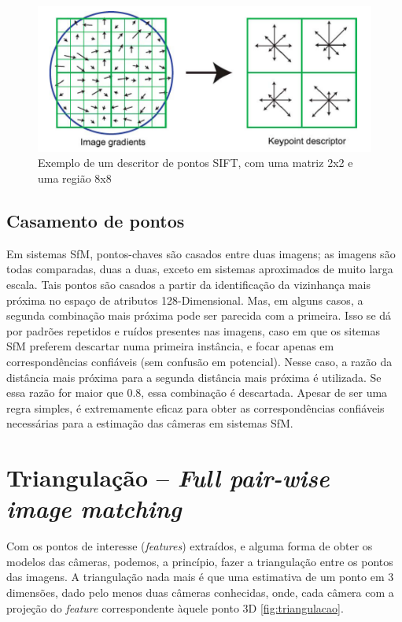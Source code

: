\begin{figure} [!h]
	\centering
	\includegraphics[width=0.45\linewidth]{figs/descritorkeypoint.png}
	\caption{%
	Exemplo de um descritor de pontos SIFT, com uma matriz 2x2 e uma região 8x8
	}\label{fig:descritorkeypoint}
\end{figure}

\subsection*{Casamento de pontos}

Em sistemas SfM, pontos-chaves são casados entre duas imagens; as imagens são
todas comparadas, duas a duas, exceto em sistemas aproximados de muito larga escala.
Tais pontos são casados a partir da identificação da
vizinhança mais próxima no espaço de atributos 128-Dimensional. Mas, em alguns
casos, a segunda combinação mais próxima pode ser parecida com a primeira. Isso
se dá por padrões repetidos e ruídos presentes nas imagens, caso em que os
sitemas SfM preferem descartar numa primeira instância, e focar apenas em
correspondências confiáveis (sem confusão em potencial).  Nesse caso, a razão da distância
mais próxima para a segunda distância mais próxima é utilizada. Se essa razão
for maior que 0.8, essa combinação é descartada. Apesar de ser uma regra
simples, é extremamente eficaz para obter as correspondências confiáveis
necessárias para a estimação das câmeras em sistemas SfM.

\section*{Triangulação -- \emph{Full pair-wise image matching}}

Com os pontos de interesse (\emph{features}) extraídos, e alguma forma de
obter os modelos das câmeras, podemos, a princípio, fazer a
triangulação entre os pontos das imagens.  
A triangulação nada mais é que uma estimativa de um ponto em 3 dimensões, dado
pelo menos duas câmeras conhecidas, onde, cada câmera com a projeção do
\emph{feature} correspondente àquele ponto 3D \ref{fig:triangulacao}.

